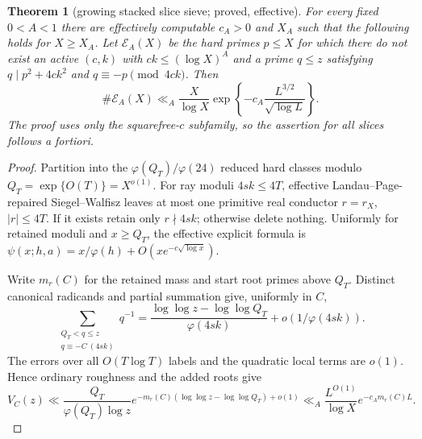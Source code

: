 \documentclass[10pt,reqno]{amsart}
\newtheorem{theorem}{Theorem}[section]
\theoremstyle{definition}
\newcommand{\1}{\mathbf 1}
\begin{document}
\begin{theorem}[growing stacked slice sieve; proved, effective]
\label{thm:growing-stack}
For every fixed $0<A<1$ there are effectively computable $c_A>0$ and $X_A$
such that the following holds for $X\geq X_A$.  Let $\mathcal E_A(X)$ be
the hard primes $p\leq X$ for which there do not exist an active $(c,k)$
with $ck\leq(\log X)^A$ and a prime $q\leq z$ satisfying
$q\mid p^2+4ck^2$ and $q\equiv-p\pmod {4ck}$.  Then
\begin{equation}\tag{53.27}
 \#\mathcal E_A(X)\ll_A\frac X{\log X}
 \exp\left\{-c_A\frac{L^{3/2}}{\sqrt{\log L}}\right\}.
\end{equation}
The proof uses only the squarefree-$c$ subfamily, so the assertion for all
slices follows a fortiori.
\end{theorem}
\begin{proof}
Partition into the $\varphi(Q_T)/\varphi(24)$ reduced hard classes modulo
$Q_T=\exp\{O(T)\}=X^{o(1)}$.  For ray moduli $4sk\leq4T$, effective
Landau--Page-repaired Siegel--Walfisz leaves at most one primitive real
conductor $r=r_X$, $|r|\leq4T$.  If it exists retain only
$r\nmid4sk$; otherwise delete nothing.  Uniformly for retained moduli and
$x\geq Q_T$, the effective explicit formula is
$\psi(x;h,a)=x/\varphi(h)+O(xe^{-c\sqrt{\log x}})$.

Write $m_r(C)$ for the retained mass and start root primes above $Q_T$.
Distinct canonical radicands and partial summation give, uniformly in $C$,
\[
 \sum_{\substack{Q_T<q\leq z\\q\equiv-C\ (4sk)}}q^{-1}
 =\frac{\log\log z-\log\log Q_T}{\varphi(4sk)}
 +o(1/\varphi(4sk)).
\]
The errors over all $O(T\log T)$ labels and the quadratic local terms are
$o(1)$.  Hence ordinary roughness and the added roots give
\begin{equation}\tag{53.30}
 V_C(z)\ll\frac{Q_T}{\varphi(Q_T)\log z}
 e^{-m_r(C)(\log\log z-\log\log Q_T)+o(1)}
 \ll_A\frac{L^{O(1)}}{\log X}e^{-c_A m_r(C)L}.
\end{equation}


\end{proof}
\end{document}
